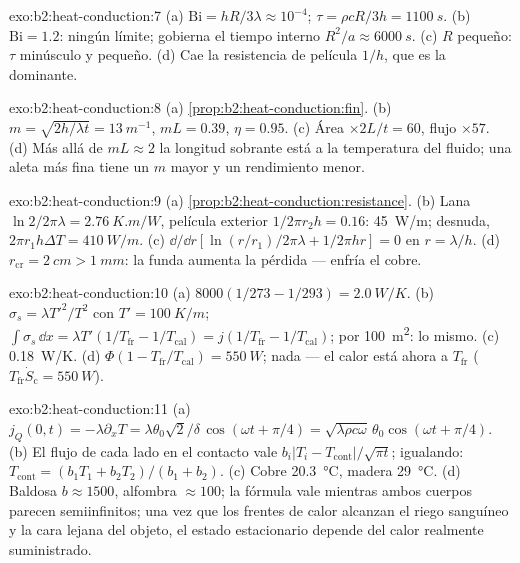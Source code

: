 \begin{solution}{exo:b2:heat-conduction:7}
(a) $\mathrm{Bi} = hR/3\lambda \approx 10^{-4}$; $\tau = \rho cR/3h = \qty{1100}{s}$.
(b) $\mathrm{Bi} = 1.2$: ningún límite; gobierna el tiempo interno $R^2/a \approx
\qty{6000}{s}$. (c) $R$ pequeño: $\tau$ minúsculo y  pequeño.
(d) Cae la resistencia de película $1/h$, que es la dominante.
\end{solution}

\begin{solution}{exo:b2:heat-conduction:8}
(a) \cref{prop:b2:heat-conduction:fin}. (b) $m = \sqrt{2h/\lambda t} =
\qty{13}{m^{-1}}$, $mL = 0.39$, $\eta = 0.95$. (c) Área $\times 2L/t = 60$, flujo
$\times 57$. (d) Más allá de $mL \approx 2$ la longitud sobrante está a la temperatura
del fluido; una aleta más fina tiene un $m$ mayor y un rendimiento menor.
\end{solution}

\begin{solution}{exo:b2:heat-conduction:9}
(a) \cref{prop:b2:heat-conduction:resistance}. (b) Lana $\ln 2/2\pi\lambda =
\qty{2.76}{K.m/W}$, película exterior $1/2\pi r_2h = 0.16$: \qty{45}{W/m}; desnuda,
$2\pi r_1h\Delta T = \qty{410}{W/m}$. (c) $\dd/\dd r[\ln(r/r_1)/2\pi\lambda + 1/2\pi hr]
= 0$ en $r = \lambda/h$. (d) $r_{\text{cr}} = \qty{2}{cm} > \qty{1}{mm}$: la funda
aumenta la pérdida --- enfría el cobre.
\end{solution}

\begin{solution}{exo:b2:heat-conduction:10}
(a) $8000(1/273 - 1/293) = \qty{2.0}{W/K}$. (b) $\sigma_s = \lambda T'^2/T^2$ con
$T' = \qty{100}{K/m}$; $\int\sigma_s\,\dd x = \lambda T'(1/T_{\text{fr}} - 1/T_{\text{cal}})
= j(1/T_{\text{fr}} - 1/T_{\text{cal}})$; por \qty{100}{m^2}: lo mismo. (c)
\qty{0.18}{W/K}. (d) $\Phi(1 - T_{\text{fr}}/T_{\text{cal}}) = \qty{550}{W}$; nada
--- el calor está ahora a $T_{\text{fr}}$ ($T_{\text{fr}}\dot S_{\text{c}} = \qty{550}{W}$).
\end{solution}

\begin{solution}{exo:b2:heat-conduction:11}
(a) $j_Q(0,t) = -\lambda\partial_xT = \lambda\theta_0\sqrt2/\delta\,\cos(\omega t +
\pi/4) = \sqrt{\lambda\rho c\omega}\,\theta_0\cos(\omega t + \pi/4)$. (b) El flujo de cada
lado en el contacto vale $b_i|T_i - T_{\text{cont}}|/\sqrt{\pi t}$; igualando:
$T_{\text{cont}} = (b_1T_1 + b_2T_2)/(b_1 + b_2)$. (c) Cobre \qty{20.3}{\celsius},
madera \qty{29}{\celsius}. (d) Baldosa $b \approx 1500$, alfombra $\approx 100$; la
fórmula vale mientras ambos cuerpos parecen semiinfinitos; una vez que los frentes
de calor alcanzan el riego sanguíneo y la cara lejana del objeto, el estado
estacionario depende del calor realmente suministrado.
\end{solution}

